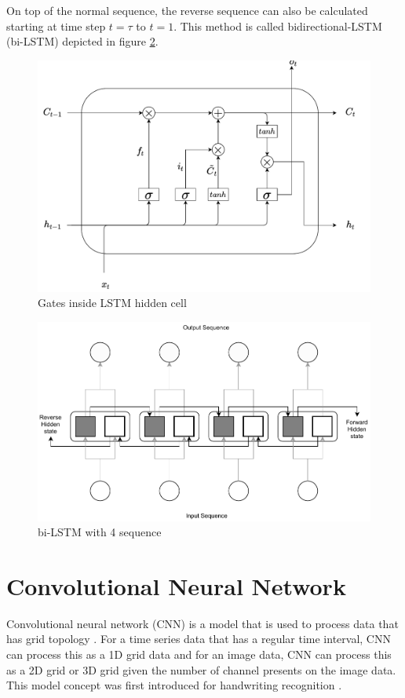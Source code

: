     On top of the normal sequence, the reverse sequence can also be
    calculated starting at time step $t=\tau$ to $t = 1$. This method
    is called bidirectional-LSTM (bi-LSTM) depicted in figure
    \ref{fig:bilstm}.
    
    \begin{figure}
        \centering
        \includegraphics[width=.6\linewidth]{images/lstm.pdf}
        \caption{Gates inside LSTM hidden cell}
        \label{fig:lstm}
    \end{figure}

    \begin{figure}[H]
        \centering
        \includegraphics[width=.8\linewidth]{images/bi-lstm.pdf}
        \caption{bi-LSTM with 4 sequence}
        \label{fig:bilstm}
    \end{figure}

\section{Convolutional Neural Network}
    Convolutional neural network (CNN) is a model that is used to
    process data that has grid topology \citep{Goodfellow-et-al-2016}.
    For a time series data that has a regular time interval, CNN can
    process this as a 1D grid data and for an image data, CNN can
    process this as a 2D grid or 3D grid given the number of channel
    presents on the image data. This model concept was first
    introduced for handwriting recognition
    \citep{generalization1989lecun}.

